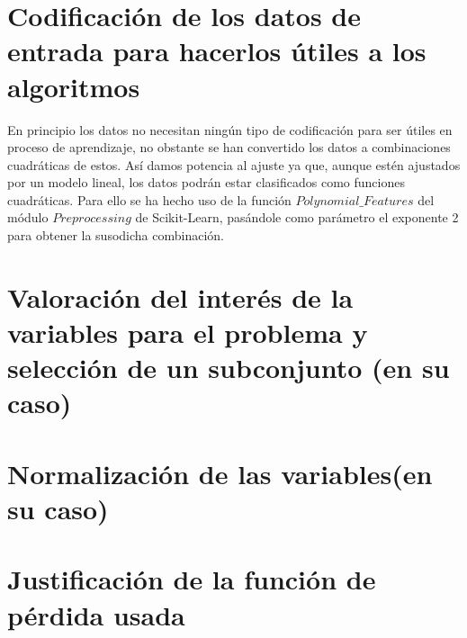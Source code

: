\documentclass{article}
\begin{document}
	
	
	\section{Codificación de los datos de entrada para hacerlos útiles a los algoritmos} %
	
	
	En principio los datos no necesitan ningún tipo de codificación para ser útiles en proceso de aprendizaje, no obstante se han convertido los datos a combinaciones cuadráticas de estos. Así damos potencia al ajuste ya que, aunque estén ajustados por un modelo lineal, los datos podrán estar clasificados como funciones cuadráticas. Para ello se ha hecho uso de la función $Polynomial\_Features$ del módulo $Preprocessing$ de Scikit-Learn, pasándole como parámetro el exponente 2 para obtener la susodicha combinación.
	
	
	\section{Valoración del interés de la variables para el problema y selección de un subconjunto (en su caso)} %
	
	
	
	\section{Normalización de las variables(en su caso)} %
	
	
	
	\section{Justificación de la función de pérdida usada} %
	
\end{document}
